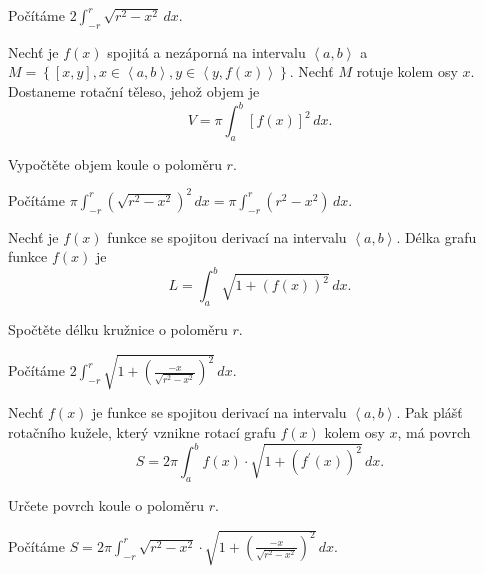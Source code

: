 \begin{reseni}
Počítáme $2\int_{-r}^r \sqrt{r^2-x^2}\, dx  $.
\end{reseni}

\begin{pozn}
    Nechť je $f(x)$ spojitá a nezáporná na intervalu $\left < a,b \right > $ a
    $M=\left \{ \left [ x,y \right ], x \in \left < a,b \right >, y \in \left < y, f(x) \right >    \right \} .$
    Nechť $M$ rotuje kolem osy $x$. Dostaneme rotační těleso, jehož objem je
    $$V=\pi \int _a^b \left [ f(x) \right ]^2 \, dx. $$
\end{pozn}

\begin{priklad}
Vypočtěte objem koule o poloměru $r$.
\end{priklad}

\begin{reseni}
Počítáme $\pi\int _{-r}^r(\sqrt{r^2-x^2} )^2 \, dx=\pi\int_{-r}^r(r^2-x^2)\, dx$.
\end{reseni}

\begin{pozn}
Nechť je $f(x)$ funkce se spojitou derivací na intervalu $\left < a,b \right > $. Délka
grafu funkce $f(x)$ je
$$L=\int_a^b \sqrt{1+(f(x))^2}\, dx. $$
\end{pozn}

\begin{priklad}
Spočtěte délku kružnice o poloměru $r$.
\end{priklad}

\begin{reseni}
Počítáme $2\int _{-r}^r \sqrt{1+\left ( \frac{-x}{\sqrt{r^2-x^2}} \right )^2 }\, dx.  $
\end{reseni}

\begin{pozn}
    Nechť $f(x)$ je funkce se spojitou derivací na intervalu $\left < a,b \right > .$
    Pak plášť rotačního kužele, který vznikne rotací grafu $f(x)$ kolem osy $x$, má
   povrch
  $$S=2\pi\int_a^b f(x)\cdot \sqrt{1+(f^\prime(x))^2}\, dx. $$
\end{pozn}

\begin{priklad}
Určete povrch koule o poloměru $r$.
\end{priklad}

\begin{reseni}
Počítáme $S=2\pi\int_{-r}^r \sqrt{r^2-x^2}\cdot \sqrt{1+\left ( \frac{-x}{\sqrt{r^2-x^2} } \right )^2 } \, dx. $
\end{reseni}
